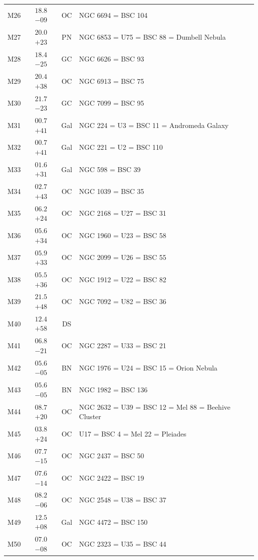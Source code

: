 \begin{table}[t]
\begin{tabularx}{\linewidth}{lccX}
M26  &$18.8$ $-09$&OC &NGC 6694 = BSC 104\\
M27  &$20.0$ $+23$&PN &NGC 6853 = U75 = BSC 88 = Dumbell Nebula\\
M28  &$18.4$ $-25$&GC &NGC 6626 = BSC 93\\
M29  &$20.4$ $+38$&OC &NGC 6913 = BSC 75\\
M30  &$21.7$ $-23$&GC &NGC 7099 = BSC 95\\
M31  &$00.7$ $+41$&Gal&NGC 224 = U3 = BSC 11 = Andromeda Galaxy\\
M32  &$00.7$ $+41$&Gal&NGC 221 = U2 = BSC 110\\
M33  &$01.6$ $+31$&Gal&NGC 598 = BSC 39\\
M34  &$02.7$ $+43$&OC &NGC 1039 = BSC 35\\
M35  &$06.2$ $+24$&OC &NGC 2168 = U27 = BSC 31\\
M36  &$05.6$ $+34$&OC &NGC 1960 = U23 = BSC 58\\
M37  &$05.9$ $+33$&OC &NGC 2099 = U26 = BSC 55\\
M38  &$05.5$ $+36$&OC &NGC 1912 = U22 = BSC 82\\
M39  &$21.5$ $+48$&OC &NGC 7092 = U82 = BSC 36\\
M40  &$12.4$ $+58$&DS &\\
M41  &$06.8$ $-21$&OC &NGC 2287 = U33 = BSC 21\\
M42  &$05.6$ $-05$&BN &NGC 1976 = U24 = BSC 15 = Orion Nebula\\
M43  &$05.6$ $-05$&BN &NGC 1982 = BSC 136\\
M44  &$08.7$ $+20$&OC &NGC 2632 = U39 = BSC 12 = Mel 88 = Beehive Cluster\\
M45  &$03.8$ $+24$&OC &U17 = BSC 4 = Mel 22 = Pleiades\\
M46  &$07.7$ $-15$&OC &NGC 2437 = BSC 50\\
M47  &$07.6$ $-14$&OC &NGC 2422 = BSC 19\\
M48  &$08.2$ $-06$&OC &NGC 2548 = U38 = BSC 37\\
M49  &$12.5$ $+08$&Gal&NGC 4472 = BSC 150\\
M50  &$07.0$ $-08$&OC &NGC 2323 = U35 = BSC 44\\

        \hline
    \end{tabularx}
\end{table}
\clearpage


